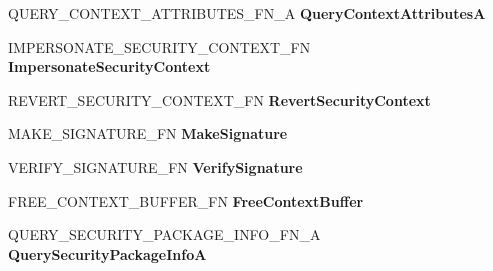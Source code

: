 \begin{DoxyCompactItemize}
Q\+U\+E\+R\+Y\+\_\+\+C\+O\+N\+T\+E\+X\+T\+\_\+\+A\+T\+T\+R\+I\+B\+U\+T\+E\+S\+\_\+\+F\+N\+\_\+A {\bfseries Query\+Context\+AttributesA}
\item 
\mbox{\label{struct___s_e_c_u_r_i_t_y___f_u_n_c_t_i_o_n___t_a_b_l_e___a_a6c7e912ed45300027d938d6a6ee4ff49}} 
I\+M\+P\+E\+R\+S\+O\+N\+A\+T\+E\+\_\+\+S\+E\+C\+U\+R\+I\+T\+Y\+\_\+\+C\+O\+N\+T\+E\+X\+T\+\_\+\+FN {\bfseries Impersonate\+Security\+Context}
\item 
\mbox{\label{struct___s_e_c_u_r_i_t_y___f_u_n_c_t_i_o_n___t_a_b_l_e___a_aa30949c7424e23c759c3d140dccfcf2a}} 
R\+E\+V\+E\+R\+T\+\_\+\+S\+E\+C\+U\+R\+I\+T\+Y\+\_\+\+C\+O\+N\+T\+E\+X\+T\+\_\+\+FN {\bfseries Revert\+Security\+Context}
\item 
\mbox{\label{struct___s_e_c_u_r_i_t_y___f_u_n_c_t_i_o_n___t_a_b_l_e___a_a76e429f04b668e7bdfbdff77da157d2f}} 
M\+A\+K\+E\+\_\+\+S\+I\+G\+N\+A\+T\+U\+R\+E\+\_\+\+FN {\bfseries Make\+Signature}
\item 
\mbox{\label{struct___s_e_c_u_r_i_t_y___f_u_n_c_t_i_o_n___t_a_b_l_e___a_a6a89267965723582646f4a2278819d70}} 
V\+E\+R\+I\+F\+Y\+\_\+\+S\+I\+G\+N\+A\+T\+U\+R\+E\+\_\+\+FN {\bfseries Verify\+Signature}
\item 
\mbox{\label{struct___s_e_c_u_r_i_t_y___f_u_n_c_t_i_o_n___t_a_b_l_e___a_a1b6096cdd809b52b569a308526a69fb3}} 
F\+R\+E\+E\+\_\+\+C\+O\+N\+T\+E\+X\+T\+\_\+\+B\+U\+F\+F\+E\+R\+\_\+\+FN {\bfseries Free\+Context\+Buffer}
\item 
\mbox{\label{struct___s_e_c_u_r_i_t_y___f_u_n_c_t_i_o_n___t_a_b_l_e___a_a421cace80b468235126c7bfb10803344}} 
Q\+U\+E\+R\+Y\+\_\+\+S\+E\+C\+U\+R\+I\+T\+Y\+\_\+\+P\+A\+C\+K\+A\+G\+E\+\_\+\+I\+N\+F\+O\+\_\+\+F\+N\+\_\+A {\bfseries Query\+Security\+Package\+InfoA}
\item 
\mbox{\label{struct___s_e_c_u_r_i_t_y___f_u_n_c_t_i_o_n___t_a_b_l_e___a_a3d898f4d341104d39c51630d9b029381}} 

\end{DoxyCompactItemize}
